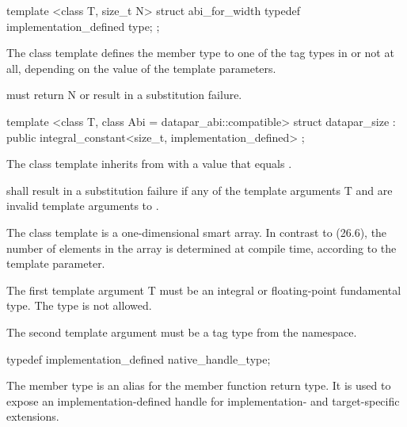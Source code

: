 \begin{wgText}
  \begin{itemdecl}
template <class T, size_t N> struct abi_for_width { typedef implementation_defined type; };
  \end{itemdecl}
  \begin{itemdescr}
    \pnum
    The  class template defines the member type  to one of the tag types in  or not at all, depending on the value of the template parameters.

    \pnum
     must return \code N or result in a substitution failure.
  \end{itemdescr}

  \begin{itemdecl}
template <class T, class Abi = datapar_abi::compatible>
struct datapar_size : public integral_constant<size_t, implementation_defined> {};
  \end{itemdecl}
  \begin{itemdescr}
    \pnum The  class template inherits from  with a value that equals \datapar{}.

    \pnum {} shall result in a substitution failure if any of the template arguments \type T and  are invalid template arguments to \datapar.
  \end{itemdescr}

  

  \pnum The class template \datapar{} is a one-dimensional smart array.
  In contrast to  (26.6), the number of elements in the array is determined at compile time, according to the  template parameter.

  \pnum The first template argument \type T must be an integral or floating-point fundamental type.
  The type \bool is not allowed.

  \pnum The second template argument  must be a tag type from the  namespace.

  \begin{itemdecl}
typedef implementation_defined native_handle_type;
  \end{itemdecl}
  \begin{itemdescr}
    \pnum
    The  member type is an alias for the  member function return type.
    It is used to expose an implementation-defined handle for implementation- and target-specific extensions.
  \end{itemdescr}


\end{wgText}

